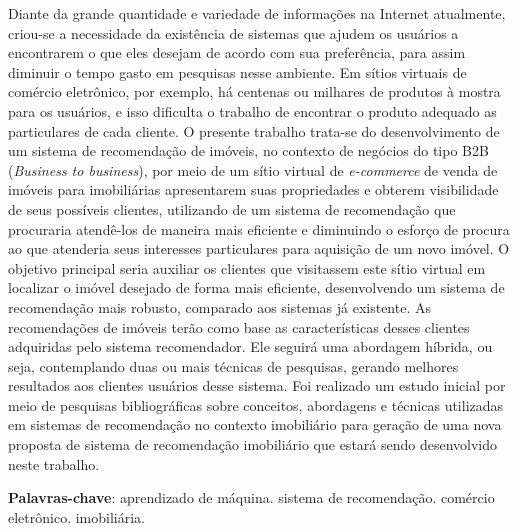 \begin{resumo}

Diante da grande quantidade e variedade de informações na Internet atualmente, criou-se a necessidade da existência de sistemas que ajudem os usuários a encontrarem o que eles desejam de acordo com sua preferência, para assim diminuir o tempo gasto em pesquisas nesse ambiente. Em sítios virtuais de comércio eletrônico, por exemplo, há centenas ou milhares de produtos à mostra para os usuários, e isso dificulta o trabalho de encontrar o produto adequado as particulares de cada cliente. O presente trabalho trata-se do desenvolvimento de um sistema de recomendação de imóveis, no contexto de negócios do tipo B2B (\textit{Business to business}), por meio de um sítio virtual de \textit{e-commerce} de venda de imóveis para imobiliárias apresentarem suas propriedades e obterem visibilidade de seus possíveis clientes, utilizando de um sistema de recomendação que procuraria atendê-los de maneira mais eficiente e diminuindo o esforço de procura ao que atenderia seus interesses particulares para aquisição de um novo imóvel. O objetivo principal seria auxiliar os clientes que visitassem este sítio virtual em localizar o imóvel desejado de forma mais eficiente, desenvolvendo um sistema de recomendação mais robusto, comparado aos sistemas já existente. As recomendações de imóveis terão como base as características desses clientes adquiridas pelo sistema recomendador. Ele seguirá uma abordagem híbrida, ou seja, contemplando duas ou mais técnicas de pesquisas, gerando melhores resultados aos clientes usuários desse sistema. Foi realizado um estudo inicial por meio de pesquisas bibliográficas sobre conceitos, abordagens e técnicas utilizadas em sistemas de recomendação no contexto imobiliário para geração de uma nova proposta de sistema de recomendação imobiliário que estará sendo desenvolvido neste trabalho.

 \vspace{\onelineskip}
    
 \noindent
 \textbf{Palavras-chave}: aprendizado de máquina. sistema de recomendação. comércio eletrônico. imobiliária.
\end{resumo}
